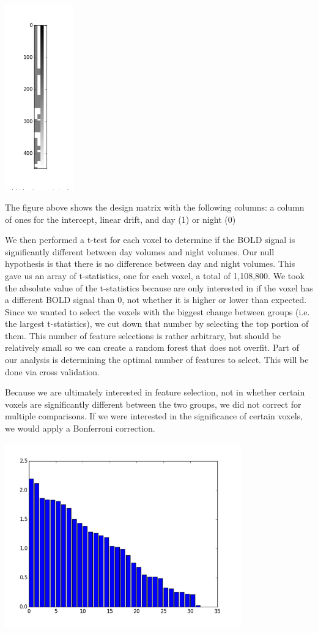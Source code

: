\documentclass[11pt]{article}
\begin{document}
\begin{center}
\includegraphics[height=8cm]{2}
\end{center}

The figure above shows the design matrix with the following columns: a column of 
ones for the intercept, linear drift, and day (1) or night (0)

We then performed a t-test for each voxel to determine if the BOLD signal is
significantly different between day volumes and night volumes.  Our null 
hypothesis is that there is no difference between day and night volumes.
This gave us an array of t-statistics, one for each voxel, a total of 1,108,800.
We took the absolute value of the t-statistics because are only interested in
if the voxel has a different BOLD signal than 0, not whether it is higher or 
lower than expected. Since we wanted to select the voxels with the biggest 
change between groups (i.e. the largest t-statistics), we cut down that
number by selecting the top portion of them.  This number of feature
selections is rather arbitrary, but should be relatively small so we can
create a random forest that does not overfit.  Part of our analysis is
determining the optimal number of features to select. This will be done via
cross validation.

Because we are ultimately interested in feature selection, not in whether
certain voxels are significantly different between the two groups, we did not
correct for multiple comparisons.  If we were interested in the significance
of certain voxels, we would apply a Bonferroni correction.

\begin{center}
\includegraphics[height=8cm]{3}
\end{center}
\end{document}

